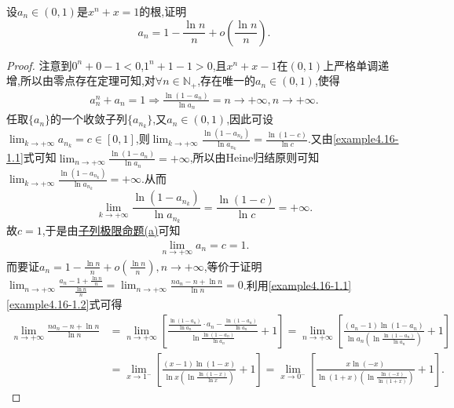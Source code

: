 \documentclass[../../main.tex]{subfiles}
\begin{document}
\begin{example}
设\(a_n\in(0,1)\)是\(x^n + x = 1\)的根,证明
\[
a_n=1-\frac{\ln n}{n}+o\left(\frac{\ln n}{n}\right).
\]
\end{example}
\begin{proof}
注意到\(0^n + 0 - 1 < 0\),\(1^n + 1 - 1 > 0\),且\(x^n + x - 1\)在\((0, 1)\)上严格单调递增,所以由零点存在定理可知,对\(\forall n\in \mathbb{N}_+\),存在唯一的\(a_n\in (0, 1)\),使得
\begin{align}\label{example4.16-1.1}
a_{n}^{n} + a_n = 1 \Rightarrow \frac{\ln(1 - a_n)}{\ln a_n} = n \rightarrow +\infty, n \rightarrow +\infty.  
\end{align}
任取\(\{ a_n \}\)的一个收敛子列\(\{ a_{n_k} \}\),又\(a_n\in (0, 1)\),因此可设\(\lim_{k\rightarrow +\infty}a_{n_k} = c\in [0, 1]\),则\(\lim_{k\rightarrow +\infty}\frac{\ln(1 - a_{n_k})}{\ln a_{n_k}} = \frac{\ln(1 - c)}{\ln c}\).又由\eqref{example4.16-1.1}式可知\(\lim_{n\rightarrow +\infty}\frac{\ln(1 - a_n)}{\ln a_n} = +\infty\),所以由Heine归结原则可知\(\lim_{k\rightarrow +\infty}\frac{\ln(1 - a_{n_k})}{\ln a_{n_k}} = +\infty\).从而
\[
\lim_{k\rightarrow +\infty}\frac{\ln(1 - a_{n_k})}{\ln a_{n_k}} = \frac{\ln(1 - c)}{\ln c} = +\infty.
\]
故\(c = 1\),于是由\hyperref[proposition:子列极限命题]{子列极限命题(a)}可知
\begin{align}\label{example4.16-1.2}
\lim_{n\rightarrow +\infty}a_n = c = 1.  
\end{align}
而要证\(a_n = 1 - \frac{\ln n}{n} + o\left(\frac{\ln n}{n}\right), n \rightarrow +\infty\),等价于证明\(\lim_{n\rightarrow +\infty}\frac{a_n - 1 + \frac{\ln n}{n}}{\frac{\ln n}{n}} = \lim_{n\rightarrow +\infty}\frac{na_n - n + \ln n}{\ln n} = 0\).利用\eqref{example4.16-1.1}\eqref{example4.16-1.2}式可得
\begin{align}
\underset{n\rightarrow +\infty}{\lim}\frac{na_n-n+\ln n}{\ln n}&=\underset{n\rightarrow +\infty}{\lim}\left[ \frac{\frac{\ln \left( 1-a_n \right)}{\ln a_n}\cdot a_n-\frac{\ln \left( 1-a_n \right)}{\ln a_n}}{\ln \frac{\ln \left( 1-a_n \right)}{\ln a_n}}+1 \right] =\underset{n\rightarrow +\infty}{\lim}\left[ \frac{\left( a_n-1 \right) \ln \left( 1-a_n \right)}{\ln a_n\left( \ln \frac{\ln \left( 1-a_n \right)}{\ln a_n} \right)}+1 \right] \nonumber
\\
&=\underset{x\rightarrow 1^-}{\lim}\left[ \frac{\left( x-1 \right) \ln \left( 1-x \right)}{\ln x\left( \ln \frac{\ln \left( 1-x \right)}{\ln x} \right)}+1 \right] =\underset{x\rightarrow 0^-}{\lim}\left[ \frac{x\ln \left( -x \right)}{\ln \left( 1+x \right) \left( \ln \frac{\ln \left( -x \right)}{\ln \left( 1+x \right)} \right)}+1 \right] .

\end{align}
\end{proof}
\end{document}
